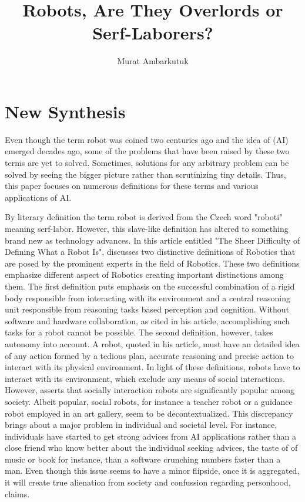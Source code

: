 \documentclass[man]{apa6}
\title{Robots, Are They Overlords or Serf-Laborers?}
\author{Murat Ambarkutuk}
\affiliation{English Language Institute, University of Delaware \\ murata@udel.edu}
\begin{document}
\maketitle
\section{New Synthesis}
     
Even though the term robot was coined two centuries ago and the idea of (AI) emerged decades ago, some of the problems that have been raised by these two terms are yet to solved. Sometimes, solutions for any arbitrary problem can be solved by seeing the bigger picture rather than scrutinizing tiny details. Thus, this paper focuses on numerous definitions for these terms and various applications of AI.\par
By literary definition the term robot is derived from the Czech word "roboti" meaning serf-labor. However, this slave-like definition has altered to something brand new as technology advances. In this article entitled "The Sheer Difficulty of Defining What a Robot Is",  discusses two distinctive definitions of Robotics that are posed by the prominent experts in the field of Robotics. These two definitions emphasize different aspect of Robotics creating important distinctions among them. The first definition puts emphasis on the successful combination of a rigid body responsible from interacting with its environment and a central reasoning unit responsible from reasoning tasks based perception and cognition. Without software and hardware collaboration, as  cited in his article, accomplishing such tasks for a robot cannot be possible. The second definition, however, takes autonomy into account. A robot,  quoted in his article, must have an detailed idea of any action formed by a tedious plan, accurate reasoning and precise action to interact with its physical environment. In light of these definitions, robots have to interact with its environment, which exclude any means of social interactions. However,  asserts that socially interaction robots are significantly popular among society. Albeit popular, social robots, for instance a teacher robot or a guidance robot employed in an art gallery, seem to be decontextualized. This discrepancy brings about a major problem in individual and societal level. For instance, individuals have started to get strong advices from AI applications rather than a close friend who know better about the individual seeking advices, the taste of of music or book for instance, than a software crunching numbers faster than a man. Even though this issue seems to have a minor flipside, once it is aggregated, it will create true alienation from society and confussion regarding personhood,  claims.\par
\end{document}
